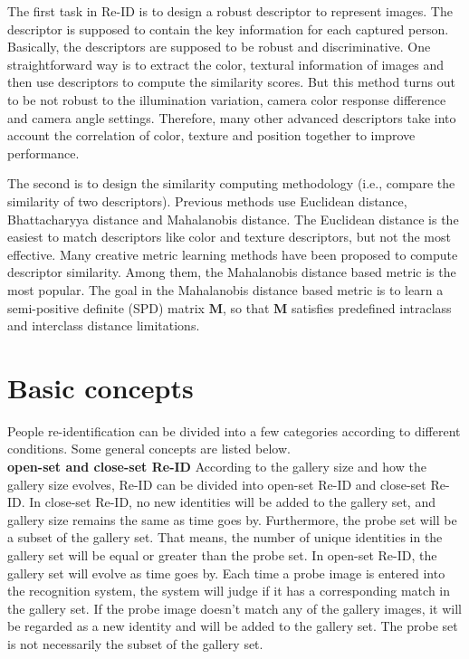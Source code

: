 The first task in Re-ID is to design a robust descriptor to represent images. The descriptor is supposed to contain the key information for each captured person. Basically, the descriptors are supposed to be robust and discriminative. One straightforward way is to extract the color, textural information of images and then use descriptors to compute the similarity scores. But this method turns out to be not robust to the illumination variation, camera color response difference and camera angle settings.  Therefore, many other advanced descriptors take into account the correlation of color, texture and position together to improve performance.

The second is to design the similarity computing methodology (i.e., compare the similarity of two descriptors). Previous methods use Euclidean distance, Bhattacharyya distance and Mahalanobis distance. The Euclidean distance is the easiest to match descriptors like color and texture descriptors, but not the most effective. Many creative metric learning methods have been proposed to compute descriptor similarity. Among them, the Mahalanobis distance based metric is the most popular. The goal in the Mahalanobis distance based metric is to learn a semi-positive definite (SPD) matrix $\bm{M}$, so that $\bm{M}$ satisfies predefined intraclass and interclass distance limitations.
	
\section{Basic concepts}
People re-identification can be divided into a few categories according to different conditions. Some general concepts are listed below.\\
\indent \textbf{open-set and close-set Re-ID} \cite{REIDsurvey} According to the gallery size and how the gallery size evolves, Re-ID can be divided into open-set Re-ID and close-set Re-ID. In close-set Re-ID, no new identities will be added to the gallery set, and gallery size remains the same as time goes by. Furthermore, the probe set will be a subset of the gallery set. That means, the number of unique identities in the gallery set will be equal or greater than the probe set. In open-set Re-ID, the gallery set will evolve as time goes by. Each time a probe image is entered into the recognition system, the system will judge if it has a corresponding match in the gallery set. If the probe image doesn't match any of the gallery images, it will be regarded as a new identity and will be added to the gallery set. The probe set is not necessarily the subset of the gallery set. 

